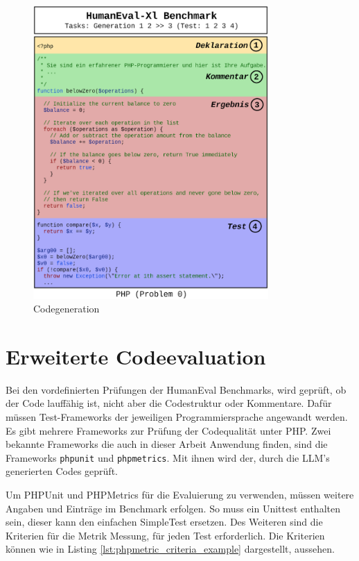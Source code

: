 \begin{figure}[!ht]
	\includegraphics[width=0.8\textwidth]{content/chapter_intruduction/images/code_generation_humaneval_x.eps}
	\centering
	\caption{Codegeneration}
	\label{img:code_generation_humaneval}
\end{figure}

\newpage

\section{Erweiterte Codeevaluation}
Bei den vordefinierten Prüfungen der HumanEval Benchmarks, wird geprüft, ob der Code lauffähig ist, nicht aber die Codestruktur oder Kommentare. Dafür müssen Test-Frameworks der jeweiligen Programmiersprache angewandt werden. Es gibt mehrere Frameworks zur Prüfung der Codequalität unter PHP. Zwei bekannte Frameworks die auch in dieser Arbeit Anwendung finden, sind die Frameworks \texttt{phpunit} und \texttt{phpmetrics}. Mit ihnen wird der, durch die LLM's generierten Codes geprüft.\vspace{0.2cm}

Um PHPUnit und PHPMetrics für die Evaluierung zu verwenden, müssen weitere Angaben und Einträge im Benchmark erfolgen. So muss ein Unittest enthalten sein, dieser kann den einfachen SimpleTest ersetzen. Des Weiteren sind die Kriterien für die Metrik Messung, für jeden Test erforderlich. Die Kriterien können wie in Listing \ref{lst:phpmetric_criteria_example} dargestellt, aussehen.

